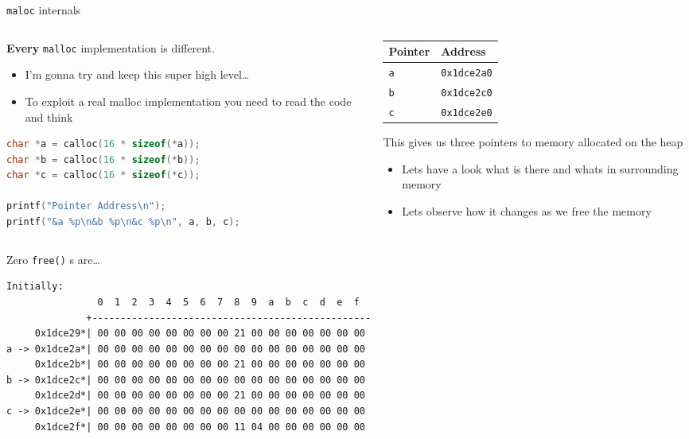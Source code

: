 \documentclass[9pt,aspectratio=169]{beamer}
\renewcommand{\alert}[1]{\textbf{#1}}
\begin{document}
\begin{frame}[label={sec:org06eeade},fragile]{\texttt{maloc} internals}
 \begin{columns}
\begin{column}[t]{0.49\columnwidth}
\alert{Every} \texttt{malloc} implementation is different.
\begin{itemize}
\item I'm gonna try and keep this super high level…
\item To exploit a real malloc implementation you need to read the code and think
\end{itemize}

\begin{lstlisting}[language=C,numbers=none]
char *a = calloc(16 * sizeof(*a));
char *b = calloc(16 * sizeof(*b));
char *c = calloc(16 * sizeof(*c));

printf("Pointer Address\n");
printf("&a %p\n&b %p\n&c %p\n", a, b, c);
\end{lstlisting}
\end{column}
\begin{column}[t]{0.49\columnwidth}
\begin{center}
\begin{tabular}{ll}
Pointer & Address\\[0pt]
\hline
\texttt{a} & \texttt{0x1dce2a0}\\[0pt]
\texttt{b} & \texttt{0x1dce2c0}\\[0pt]
\texttt{c} & \texttt{0x1dce2e0}\\[0pt]
\end{tabular}
\end{center}

This gives us three pointers to memory allocated on the heap
\begin{itemize}
\item Lets have a look  what is there and whats in surrounding memory
\item Lets observe how it changes as we free the memory
\end{itemize}
\end{column}
\end{columns}
\end{frame}
\begin{frame}[label={sec:org218385f},fragile]{Zero \texttt{free()} s are\ldots{}}
 \begin{verbatim}
Initially:
                0  1  2  3  4  5  6  7  8  9  a  b  c  d  e  f  
              +-------------------------------------------------
     0x1dce29*| 00 00 00 00 00 00 00 00 21 00 00 00 00 00 00 00 
a -> 0x1dce2a*| 00 00 00 00 00 00 00 00 00 00 00 00 00 00 00 00 
     0x1dce2b*| 00 00 00 00 00 00 00 00 21 00 00 00 00 00 00 00 
b -> 0x1dce2c*| 00 00 00 00 00 00 00 00 00 00 00 00 00 00 00 00 
     0x1dce2d*| 00 00 00 00 00 00 00 00 21 00 00 00 00 00 00 00 
c -> 0x1dce2e*| 00 00 00 00 00 00 00 00 00 00 00 00 00 00 00 00 
     0x1dce2f*| 00 00 00 00 00 00 00 00 11 04 00 00 00 00 00 00 
\end{verbatim}
\end{frame}
\end{document}
